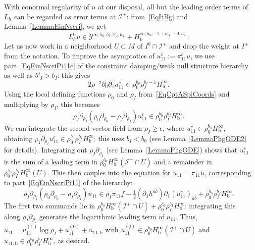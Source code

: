 \documentclass[reqno,11pt,letterpaper]{amsart}
\numberwithin{equation}{section}
\numberwithin{figure}{section}
\theoremstyle{definition}
\theoremstyle{remark}
\newcommand{\mc}{\mathcal}
\newcommand{\cY}{\mc Y}
\newcommand{\ms}{\mathscr}
\newcommand{\scri}{\ms I}
\newcommand{\eps}{\epsilon}
\newcommand{\pa}{\partial}
\newcommand{\bop}{{\mathrm{b}}}
\newcommand{\half}{\tfrac{1}{2}}
\newcommand{\Hb}{H_{\bop}}
\begin{document}
With conormal regularity of $u$ at our disposal, all but the leading order terms of $L_h$ can be regarded as error terms at $\scri^+$: from~\eqref{EqItBg} and Lemma~\ref{LemmaEinNscri}, we get
\[
  L_h^0 u \in \cY^{\infty;b_0,b_I,b'_I,b_+} + \Hb^{\infty;b_0,-1+b'_I-0,a_+}.
\]
Let us now work in a neighborhood $U\subset M$ of $I^0\cap\scri^+$ and drop the weight at $I^+$ from the notation. To improve the asymptotics of $u_{1 1}^c:=\pi_{1 1}^c u$, we use part~\eqref{EqEinNscriPi11c} of the constraint damping/weak null structure hierarchy as well as $b'_I>b_I$: this gives
\[
  2\rho^{-2}\pa_0\pa_1 u_{1 1}^c \in \rho_0^{b_0}\rho_I^{b_I-1}\Hb^\infty.
\]
Using the local defining functions $\rho_0$ and $\rho_I$ from~\eqref{EqCptASplCoords} and multiplying by $\rho_I$, this becomes
\begin{equation}
\label{EqIti0Scri11c}
  \rho_I\pa_{\rho_I}(\rho_0\pa_{\rho_0}-\rho_I\pa_{\rho_I})u_{1 1}^c \in \rho_0^{b_0}\rho_I^{b_I}\Hb^\infty.
\end{equation}
We can integrate the second vector field from $\rho_I\geq\eps$, where $u_{1 1}^c\in\rho_0^{b_0}\Hb^\infty$, obtaining $\rho_I\pa_{\rho_I}u_{1 1}^c\in\rho_0^{b_0}\rho_I^{b_I}\Hb^\infty$; this uses $b_I<b_0$ (see Lemma~\ref{LemmaPhgODE2} for details). Integrating out $\rho_I\pa_{\rho_I}$ (see Lemma~\ref{LemmaPhgODE}) shows that $u_{1 1}^c$ is the sum of a leading term in $\rho_0^{b_0}\Hb^\infty(\scri^+\cap U)$ and a remainder in $\rho_0^{b_0}\rho_I^{b_I}\Hb^\infty(U)$. This then couples into the equation for $u_{1 1}=\pi_{1 1}u$, corresponding to part~\eqref{EqEinNscriPi11} of the hierarchy:
\begin{equation}
\label{EqIti0Scri11}
  \rho_I\pa_{\rho_I}(\rho_0\pa_{\rho_0}-\rho_I\pa_{\rho_I})u_{1 1} \in \rho_I\pi_{1 1}f - \half(\pa_1 h^{\bar a\bar b})\pa_1(u_{1 1}^c)_{\bar a\bar b} + \rho_0^{b_0}\rho_I^{b_I}\Hb^\infty.
\end{equation}
The first two summands lie in $\rho_0^{b_0}\Hb^\infty(\scri^+\cap U)+\rho_0^{b_0}\rho_I^{b_I}\Hb^\infty$; integrating this along $\rho_I\pa_{\rho_I}$ generates the logarithmic leading term of $u_{1 1}$. Thus, $u_{1 1}=u_{1 1}^{(1)}\log\rho_I+u_{1 1}^{(0)}+u_{1 1,\bop}$ with $u_{1 1}^{(j)}\in\rho_0^{b_0}\Hb^\infty(\scri^+\cap U)$ and $u_{1 1,\bop}\in\rho_0^{b_0}\rho_I^{b_I}\Hb^\infty$, as desired.
\end{document}
